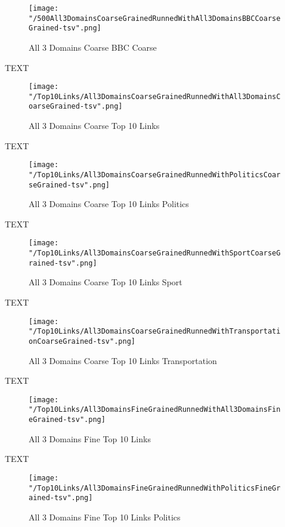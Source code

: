 \documentclass[thesis=M,english]{FITthesis}[2012/10/20]
\begin{document}
	\begin{figure}\centering
		\texttt{[image: "/500All3DomainsCoarseGrainedRunnedWithAll3DomainsBBCCoarseGrained-tsv".png]}
		\caption{All 3 Domains Coarse BBC Coarse}\label{}
	\end{figure}

	TEXT

	\begin{figure}\centering
		\texttt{[image: "/Top10Links/All3DomainsCoarseGrainedRunnedWithAll3DomainsCoarseGrained-tsv".png]}
		\caption{All 3 Domains Coarse Top 10 Links}\label{}
	\end{figure}

	TEXT

	\begin{figure}\centering
		\texttt{[image: "/Top10Links/All3DomainsCoarseGrainedRunnedWithPoliticsCoarseGrained-tsv".png]}
		\caption{All 3 Domains Coarse Top 10 Links Politics}\label{}
	\end{figure}	

	TEXT	

	\begin{figure}\centering
		\texttt{[image: "/Top10Links/All3DomainsCoarseGrainedRunnedWithSportCoarseGrained-tsv".png]}
		\caption{All 3 Domains Coarse Top 10 Links Sport}\label{}
	\end{figure}
	
		TEXT	

	\begin{figure}\centering
		\texttt{[image: "/Top10Links/All3DomainsCoarseGrainedRunnedWithTransportationCoarseGrained-tsv".png]}
		\caption{All 3 Domains Coarse Top 10 Links Transportation}\label{}	
	\end{figure}
		
		TEXT	

	\begin{figure}\centering
		\texttt{[image: "/Top10Links/All3DomainsFineGrainedRunnedWithAll3DomainsFineGrained-tsv".png]}
		\caption{All 3 Domains Fine Top 10 Links }\label{}	
	\end{figure}
	
	TEXT

	\begin{figure}\centering
		\texttt{[image: "/Top10Links/All3DomainsFineGrainedRunnedWithPoliticsFineGrained-tsv".png]}
		\caption{All 3 Domains Fine Top 10 Links Politics}\label{}
	\end{figure}	
\end{document}
